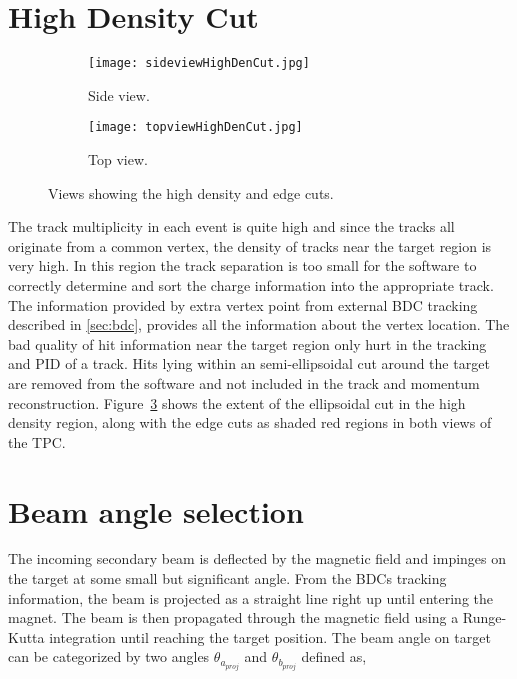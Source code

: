 \section{High Density Cut}


\begin{figure}[!htb]

     \centering
     \begin{subfigure}[b]{0.49\textwidth}
         \centering
         \texttt{[image: sideviewHighDenCut.jpg]}
         \caption{Side view.}
         \label{fig:sideHigh}
     \end{subfigure}
     \hfill
     \begin{subfigure}[b]{0.49\textwidth}
         \centering
         \texttt{[image: topviewHighDenCut.jpg]}
         \caption{Top view.}
         \label{fig:topHigh}
     \end{subfigure}
        \label{fig:highcut}
        \caption{Views showing the high density and edge cuts.}
        \label{fig:elipsecut}
\end{figure}
The track multiplicity in each event is quite high and since the tracks all originate from a common vertex, the density of tracks near the target region is very high. In this region the track separation is too small for the software to correctly determine and sort the charge information into the appropriate track. The information provided by extra vertex point from external BDC tracking described in \ref{sec:bdc}, provides all the information about the vertex location. The bad quality of hit information near the target region only hurt in the tracking and PID of a track. Hits lying within an semi-ellipsoidal cut around the target are removed from the software and not included in the track and momentum reconstruction. Figure~\ref{fig:elipsecut} shows the extent of the ellipsoidal cut in the high density region, along with the edge cuts as shaded red regions in both views of the TPC. 

\section{Beam angle selection}
The incoming secondary beam is deflected by the magnetic field and impinges on the target at some small but significant angle. From the BDCs tracking information, the beam is projected as a straight line right up until entering the magnet.  The beam is then propagated through the magnetic field using a Runge-Kutta integration until reaching the target position. The beam angle on target can be categorized by two angles $\theta_{a_{proj}}$ and $\theta_{b_{proj}}$ defined as, 

